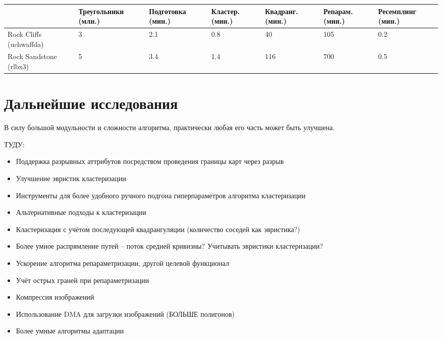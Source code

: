 \documentclass{article}
\begin{document}
\begin{center}
\begin{tabular}{ p{16mm} | p{20mm} | p{17mm} | p{12mm} | p{14mm} | p{13mm} | p{17mm} }
                        & Треугольники (млн.) & Подготовка (мин.) & Кластер. (мин.) & Квадранг. (мин.) & Репарам. (мин.) & Ресемплинг (мин.) \\
\hline
Rock Cliffs (uchwaffda) & 3    & 2.1   & 0.8  & 40   & 105    & 0.2   \\
\hline
Rock Sandstone (rlbx3)  & 5    & 3.4   & 1.4  & 116  & 700    & 0.5   \\
\end{tabular}
\end{center}


\section{Дальнейшие исследования}
В силу большой модульности и сложности алгоритма, практически любая его часть может быть улучшена.

ТУДУ:
\begin{itemize}
\item Поддержка разрывных аттрибутов посредством проведения границы карт через разрыв
\item Улучшение эвристик кластеризации
\item Инструменты для более удобного ручного подгона гиперпараметров алгоритма кластеризации
\item Альтернативные подходы к кластеризации
\item Кластеризация с учётом последующей квадрангуляции (количество соседей как эвристика?)
\item Более умное распрямление путей -- поток средней кривизны? Учитывать эвристики кластеризации?
\item Ускорение алгоритма репараметризации, другой целевой функционал
\item Учёт острых граней при репараметризации
\item Компрессия изображений
\item Использование DMA для загрузки изображений (БОЛЬШЕ полигонов)
\item Более умные алгоритмы адаптации
\end{itemize}




\end{document}
